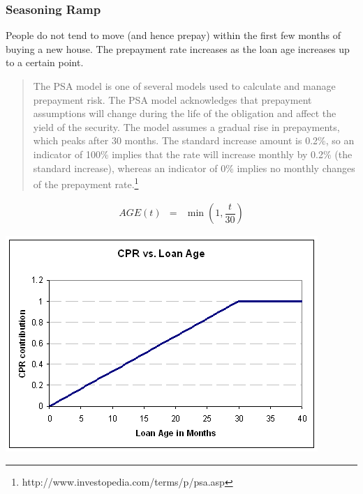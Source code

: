 \documentclass[10pt,letterpaper]{article}
\begin{document}
\subsubsection{Seasoning Ramp}
People do not tend to move (and hence prepay) within the first few months of buying a new house. The prepayment rate increases as the loan age increases up to a certain point.
\begin{quote}
The PSA model is one of several models used to calculate and manage prepayment risk. The PSA model acknowledges that prepayment assumptions will change during the life of the obligation and affect the yield of the security. The model assumes a gradual rise in prepayments, which peaks after 30 months. The standard increase amount is 0.2\%, so an indicator of 100\% implies that the rate will increase monthly by 0.2\% (the standard increase), whereas an indicator of 0\% implies no monthly changes of the prepayment rate.\footnote{http://www.investopedia.com/terms/p/psa.asp} 
\end{quote}
\begin{eqnarray}
AGE(t) & = & \min \left( 1, \dfrac{t}{30} \right)
\end{eqnarray}
\begin{center}
\includegraphics[scale=0.6]{seasoning.png}
\end{center}
\end{document}
